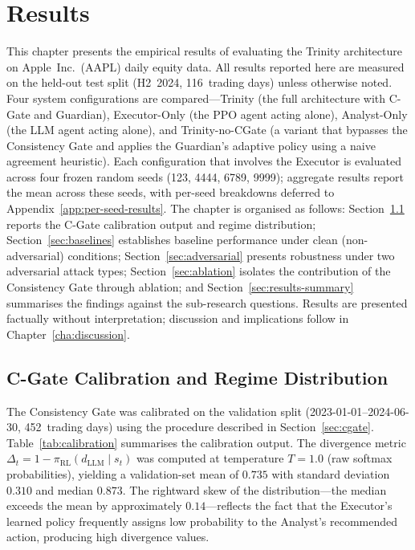 \chapter{Results}
\label{cha:results}

This chapter presents the empirical results of evaluating the Trinity
architecture on Apple~Inc.\ (AAPL) daily equity data. All results reported
here are measured on the held-out test split (H2~2024, 116~trading days)
unless otherwise noted. Four system configurations are compared---Trinity
(the full architecture with C-Gate and Guardian), Executor-Only (the PPO
agent acting alone), Analyst-Only (the LLM agent acting alone), and
Trinity-no-CGate (a variant that bypasses the Consistency Gate and applies
the Guardian's adaptive policy using a naive agreement heuristic). Each
configuration that involves the Executor is evaluated across four frozen
random seeds (123, 4444, 6789, 9999); aggregate results report the mean
across these seeds, with per-seed breakdowns deferred to
Appendix~\ref{app:per-seed-results}. The chapter is organised as follows:
Section~\ref{sec:calibration} reports the C-Gate calibration output and
regime distribution; Section~\ref{sec:baselines} establishes baseline
performance under clean (non-adversarial) conditions;
Section~\ref{sec:adversarial} presents robustness under two adversarial
attack types; Section~\ref{sec:ablation} isolates the contribution of the
Consistency Gate through ablation; and Section~\ref{sec:results-summary}
summarises the findings against the sub-research questions. Results are
presented factually without interpretation; discussion and implications
follow in Chapter~\ref{cha:discussion}.

\section{C-Gate Calibration and Regime Distribution}
\label{sec:calibration}

The Consistency Gate was calibrated on the validation split
(2023-01-01--2024-06-30, 452~trading days) using the procedure described in
Section~\ref{sec:cgate}. Table~\ref{tab:calibration} summarises the
calibration output. The divergence metric $\Delta_t = 1 - \pi_{\text{RL}}
(d_{\text{LLM}} \mid s_t)$ was computed at temperature $T = 1.0$ (raw
softmax probabilities), yielding a validation-set mean of $0.735$ with
standard deviation $0.310$ and median $0.873$. The rightward skew of the
distribution---the median exceeds the mean by approximately $0.14$---reflects
the fact that the Executor's learned policy frequently assigns low
probability to the Analyst's recommended action, producing high divergence
values.

